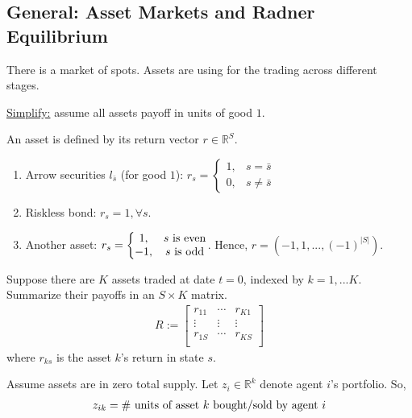 \documentclass[11pt]{elegantbook}
\begin{document}
\subsection{General: Asset Markets and Radner Equilibrium}
There is a market of spots. Assets are using for the trading across different stages.

\begin{note}
    \underline{Simplify:} assume all assets payoff in units of good $1$.
\end{note}

An asset is defined by its return vector $r\in\mathbb{R}^{S}$.

\begin{example}
    \begin{enumerate}
        \item Arrow securities $l_{\bar{s}}$ (for good $1$): $r_s=\left\{\begin{matrix}
            1,&s=\bar{s}\\
            0,&s\neq \bar{s}
        \end{matrix}\right.$
        \item Riskless bond: $r_s=1,\forall s$.
        \item Another asset: $r_s=\left\{\begin{matrix}
            1,& s \textnormal{ is even}\\
            -1,& s \textnormal{ is odd}
        \end{matrix}\right.$. Hence, $r=\left(-1,1,...,(-1)^{|S|}\right)$.
    \end{enumerate}
\end{example}

Suppose there are $K$ assets traded at date $t=0$, indexed by $k=1,...K$. Summarize their payoffs in an $S\times K$ matrix.
\begin{equation}
    \begin{aligned}
        R:=\begin{bmatrix}
            r_{11}&\cdots&r_{K1}\\
            \vdots&\vdots&\vdots\\
            r_{1S}&\cdots&r_{KS}\\
        \end{bmatrix}
    \end{aligned}
    \nonumber
\end{equation}
where $r_{ks}$ is the asset $k$'s return in state $s$.

Assume assets are in zero total supply. Let $z_i\in \mathbb{R}^k$ denote agent $i$'s portfolio. So,
\begin{equation}
    \begin{aligned}
        z_{ik}=\textnormal{\# units of asset $k$ bought/sold by agent $i$}
    \end{aligned}
    \nonumber
\end{equation}
\end{document}
